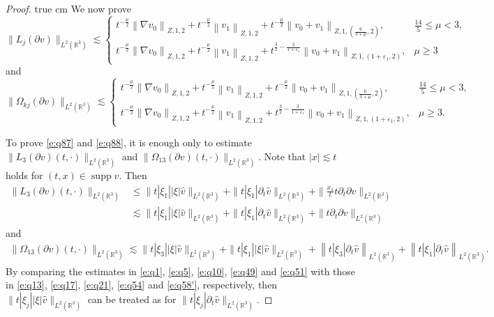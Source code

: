 \documentclass[11pt,twoside]{article}
\newcommand{\R}{\mathbb R}
\newcommand{\p}{\partial}
\newcommand{\f}{\frac}
\theoremstyle{plain}
\theoremstyle{definition}
\theoremstyle{remark}
\numberwithin{equation}{section}
\begin{document}
\begin{proof}
 true cm
We now prove
\begin{equation}\label{e:q87}
\|L_j(\p v)\|_{L^2(\R^3)} \lesssim \begin{cases}t^{-\f{\mu}{2}}\left\|\nabla v_0\right\|_{Z, 1,  2}+t^{-\f{\mu}{2}}\left\| v_1\right\|_{Z, 1,  2}+t^{-\f{\mu}{2}}\left\|v_0+v_1\right\|_{Z, 1,  (\f{6}{3+\mu},2)}, &  \f{14}{5}\leq\mu<3,  \\ t^{-\f{\mu}{2}}\left\|\nabla v_0\right\|_{Z, 1,  2}+t^{-\f{\mu}{2}}\left\| v_1\right\|_{Z, 1,  2}+t^{\f32-\f{3}{1+\varepsilon_1}}\left\|v_0+v_1\right\|_{Z, 1,  (1+\varepsilon_1,2)},
&  \mu\geq3\end{cases}
\end{equation}
and
\begin{equation}\label{e:q88}
\|\Omega_{kj}(\p v)\|_{L^2(\R^3)}  \lesssim \begin{cases}t^{-\f{\mu}{2}}\left\|\nabla v_0\right\|_{Z, 1,  2}+t^{-\f{\mu}{2}}\left\| v_1\right\|_{Z, 1,  2}+t^{-\f{\mu}{2}}\left\|v_0+v_1\right\|_{Z, 1,  (\f{6}{3+\mu},2)}, &  \f{14}{5}\leq\mu<3,  \\ t^{-\f{\mu}{2}}\left\|\nabla v_0\right\|_{Z, 1,  2}+t^{-\f{\mu}{2}}\left\| v_1\right\|_{Z, 1,  2}+t^{\f32-\f{3}{1+\varepsilon_1}}\left\|v_0+v_1\right\|_{Z, 1,  (1+\varepsilon_1,2)},
&  \mu\geq3.\end{cases}
\end{equation}

To prove \eqref{e:q87} and \eqref{e:q88}, it is enough only to estimate $\|L_3(\p v)(t, \cdot)\|_{L^2(\R^3)}$ and  $\|\Omega_{13}(\p v)(t, \cdot)\|_{L^2(\R^3)} $.
Note that $|x|\lesssim t$ holds for $(t, x)\in \operatorname{supp}v$. Then
\begin{equation}\label{e:q89}
\begin{aligned}
\|L_3(\p v)(t, \cdot)\|_{L^2(\R^3)}
& \leq \|t|\xi_1||\xi|\hat{v}\|_{L^2(\R^3)}+\|t|\xi_1|\p_t\hat{v}\|_{L^2(\R^3)}+\|\f{x_1}{t}t\p_t\p v\|_{L^2(\R^3)}\\
& \lesssim \|t|\xi_1||\xi|\hat{v}\|_{L^2(\R^3)}+\|t|\xi_1|\p_t\hat{v}\|_{L^2(\R^3)}+\|t\p_t\p v\|_{L^2(\R^3)}
\end{aligned}
\end{equation}
and
\begin{equation}\label{e:q90}
\begin{aligned}
\|\Omega_{13}(\p v)(t, \cdot)\|_{L^2(\R^3)}
\lesssim \|t|\xi_3||\xi|\hat{v}\|_{L^2(\R^3)}+\|t|\xi_1||\xi|\hat{v}\|_{L^2(\R^3)}+\left\|t|\xi_3|\p_t\hat{v}\right\|_{L^2(\R^3)}
+\left\|t|\xi_1|\p_t\hat{v}\right\|_{L^2(\R^3)}.
\end{aligned}
\end{equation}
By comparing the estimates in \eqref{e:q1}, \eqref{e:q5}, \eqref{e:q10}, \eqref{e:q49} and \eqref{e:q51}
with those in  \eqref{e:q13}, \eqref{e:q17}, \eqref{e:q21}, \eqref{e:q54} and \eqref{e:q58'}, respectively,
then $\|t|\xi_j||\xi|\hat{v}\|_{L^2(\R^3)}$ can be treated
as for $\|t|\xi_j|\p_t\hat{v}\|_{L^2(\R^3)}$.


\end{proof}
\end{document}
